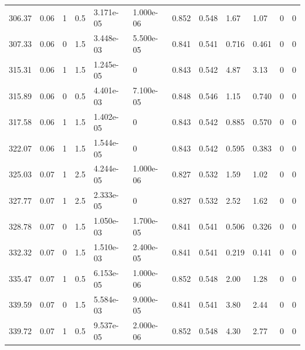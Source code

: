 \documentclass[preview]{standalone}
\begin{document}
{{{\begin{tabular}{L{1.2cm}C{1.2cm} C{0.3cm}C{0.5cm} C{1.4cm}C{1.4cm} C{1.4cm}C{1.4cm} C{1.6cm}C{1.6cm} C{1.6cm}C{1.6cm}}
  306.37  &  0.06  & 1     & 0.5 &  3.171e-05  & 1.000e-06  &  0.852&   0.548& 1.67 & 1.07   &  0 & 0  \\ 
  307.33  &  0.06  & 0     & 1.5 &  3.448e-03  & 5.500e-05  &  0.841&   0.541& 0.716 & 0.461   &  0 & 0  \\ 
  315.31  &  0.06  & 1     & 1.5 &  1.245e-05  & 0  &  0.843&   0.542& 4.87 & 3.13   &  0 & 0  \\ 
  315.89  &  0.06  & 0     & 0.5 &  4.401e-03  & 7.100e-05  &  0.848&   0.546& 1.15 & 0.740   &  0 & 0  \\ 
  317.58  &  0.06  & 1     & 1.5 &  1.402e-05  & 0  &  0.843&   0.542& 0.885 & 0.570   &  0 & 0  \\ 
  322.07  &  0.06  & 1     & 1.5 &  1.544e-05  & 0  &  0.843&   0.542& 0.595 & 0.383   &  0 & 0  \\ 
  325.03  &  0.07  & 1     & 2.5 &  4.244e-05  & 1.000e-06  &  0.827&   0.532& 1.59 & 1.02   &  0 & 0  \\ 
  327.77  &  0.07  & 1     & 2.5 &  2.333e-05  & 0  &  0.827&   0.532& 2.52 & 1.62   &  0 & 0  \\ 
  328.78  &  0.07  & 0     & 1.5 &  1.050e-03  & 1.700e-05  &  0.841&   0.541& 0.506 & 0.326   &  0 & 0  \\ 
  332.32  &  0.07  & 0     & 1.5 &  1.510e-03  & 2.400e-05  &  0.841&   0.541& 0.219 & 0.141   &  0 & 0  \\ 
  335.47  &  0.07  & 1     & 0.5 &  6.153e-05  & 1.000e-06  &  0.852&   0.548& 2.00 & 1.28   &  0 & 0  \\ 
  339.59  &  0.07  & 0     & 1.5 &  5.584e-03  & 9.000e-05  &  0.841&   0.541& 3.80 & 2.44   &  0 & 0  \\ 
  339.72  &  0.07  & 1     & 0.5 &  9.537e-05  & 2.000e-06  &  0.852&   0.548& 4.30 & 2.77   &  0 & 0  \\ 
\hline 
\end{tabular} 

}}}
\end{document}
